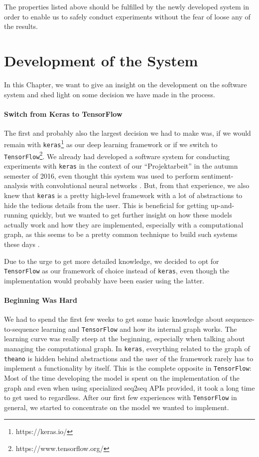 The properties listed above should be fulfilled by the newly developed system in order to enable us to safely conduct experiments without the fear of loose any of the results.

\section{Development of the System}
\label{sofware_system:development_history}
In this Chapter, we want to give an insight on the development on the software system and shed light on some decision we have made in the process.

\paragraph{Switch from Keras to TensorFlow} The first and probably also the largest decision we had to make was, if we would remain with \texttt{keras}\footnote{https://keras.io/} as our deep learning framework or if we switch to \texttt{TensorFlow}\footnote{https://www.tensorflow.org/}. We already had developed a software system for conducting experiments with \texttt{keras} in the context of our ``Projektarbeit'' in the autumn semester of 2016, even thought this system was used to perform sentiment-analysis with convolutional neural networks \cite{Vongruenigen:2017}. But, from that experience, we also knew that \texttt{keras} is a pretty high-level framework with a lot of abstractions to hide the tedious details from the user. This is beneficial for getting up-and-running quickly, but we wanted to get further insight on how these models actually work and how they are implemented, especially with a computational graph, as this seems to be a pretty common technique to build such systems these days \cite{TensorFlow:2015}\cite{Theano:2016}\cite{Torch:2011}.

Due to the urge to get more detailed knowledge, we decided to opt for \texttt{TensorFlow} as our framework of choice instead of \texttt{keras}, even though the implementation would probably have been easier using the latter.
\paragraph{Beginning Was Hard} We had to spend the first few weeks to get some basic knowledge about sequence-to-sequence learning and \texttt{TensorFlow} and how its internal graph works. The learning curve was really steep at the beginning, especially when talking about managing the computational graph. In \texttt{keras}, everything related to the graph of \texttt{theano} is hidden behind abstractions and the user of the framework rarely has to implement a functionality by itself. This is the complete opposite in \texttt{TensorFlow}: Most of the time developing the model is spent on the implementation of the graph and even when using specialized seq2seq APIs provided, it took a long time to get used to regardless. After our first few experiences with \texttt{TensorFlow} in general, we started to concentrate on the model we wanted to implement.

